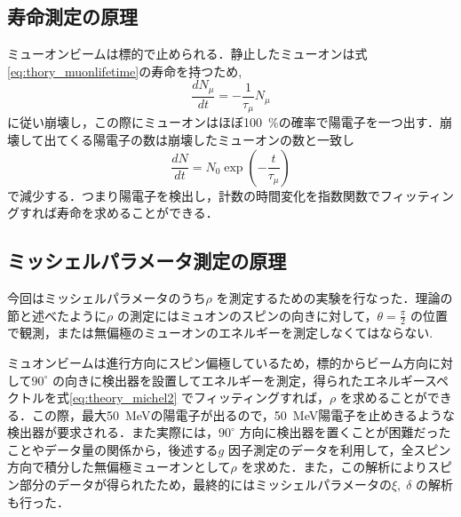 \subsection{寿命測定の原理}
ミューオンビームは標的で止められる．静止したミューオンは式\eqref{eq:thory_muonlifetime}の寿命を持つため,
\begin{equation}
\frac{dN_\mu}{dt} = -\frac{1}{\tau_\mu} N_{\mu}
\end{equation}
に従い崩壊し，この際にミューオンはほぼ100~\%の確率で陽電子を一つ出す．崩壊して出てくる陽電子の数は崩壊したミューオンの数と一致し
\begin{equation}
\frac{dN}{dt} = N_0 \exp{\left(-\frac{t}{\tau_\mu}\right) }
\end{equation}
で減少する．つまり陽電子を検出し，計数の時間変化を指数関数でフィッティングすれば寿命を求めることができる．

\subsection{ミッシェルパラメータ測定の原理}
今回はミッシェルパラメータのうち$\rho$ を測定するための実験を行なった．理論の節と述べたように$\rho$ の測定にはミュオンのスピンの向きに対して，$\theta=\frac{\pi}{2}$ の位置で観測，または無偏極のミューオンのエネルギーを測定しなくてはならない.

ミュオンビームは進行方向にスピン偏極しているため，標的からビーム方向に対して$90^{\circ}$ の向きに検出器を設置してエネルギーを測定，得られたエネルギースペクトルを式\eqref{eq:theory_michel2} でフィッティングすれば，$\rho$ を求めることができる．この際，最大50~MeVの陽電子が出るので，50~MeV陽電子を止めきるような検出器が要求される．また実際には，$90^{\circ}$ 方向に検出器を置くことが困難だったことやデータ量の関係から，後述する$g$ 因子測定のデータを利用して，全スピン方向で積分した無偏極ミューオンとして$\rho$ を求めた．また，この解析によりスピン部分のデータが得られたため，最終的にはミッシェルパラメータの$\xi,\;\delta$ の解析も行った．


